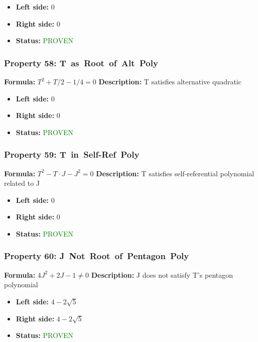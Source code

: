 \begin{itemize}
\item \textbf{Left side:} $0$
\item \textbf{Right side:} $0$
\item \textbf{Status:} \textcolor{green}{PROVEN}
\end{itemize}

\subsubsection*{Property 58: T~as~Root~of~Alt~Poly}
\textbf{Formula:} $T^2 + T/2 - 1/4 = 0$
\textbf{Description:} T satisfies alternative quadratic

\begin{itemize}
\item \textbf{Left side:} $0$
\item \textbf{Right side:} $0$
\item \textbf{Status:} \textcolor{green}{PROVEN}
\end{itemize}

\subsubsection*{Property 59: T~in~Self-Ref~Poly}
\textbf{Formula:} $T^2 - T \cdot J - J^2 = 0$
\textbf{Description:} T satisfies self-referential polynomial related to J

\begin{itemize}
\item \textbf{Left side:} $0$
\item \textbf{Right side:} $0$
\item \textbf{Status:} \textcolor{green}{PROVEN}
\end{itemize}

\subsubsection*{Property 60: J~Not~Root~of~Pentagon~Poly}
\textbf{Formula:} $4J^2 + 2J - 1  \neq  0$
\textbf{Description:} J does not satisfy T's pentagon polynomial

\begin{itemize}
\item \textbf{Left side:} $4 - 2 \sqrt{5}$
\item \textbf{Right side:} $4 - 2 \sqrt{5}$
\item \textbf{Status:} \textcolor{green}{PROVEN}
\end{itemize}

